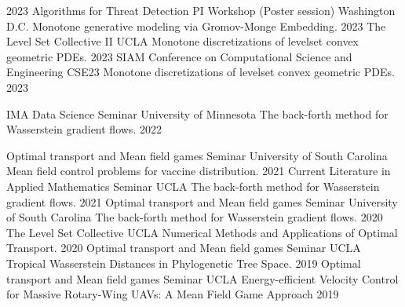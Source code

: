 \begin{cvtalks}
  \cvtalk
    {2023 Algorithms for Threat Detection PI Workshop (Poster session)} %
    {Washington D.C.}
    {Monotone generative modeling via Gromov-Monge Embedding.} %
    {2023} %
  \cvtalk
    {The Level Set Collective II} %
    {UCLA}
    {Monotone discretizations of levelset convex geometric PDEs.} %
    {2023} %
  \cvtalk
    {SIAM Conference on Computational Science and Engineering } %
    {CSE23}
    {Monotone discretizations of levelset convex geometric PDEs.} %
    {2023} %

  \cvtalk
    {IMA Data Science Seminar} %
    {University of Minnesota}
    {The back-forth method for Wasserstein gradient flows.} %
    {2022} %

  \cvtalk
    {Optimal transport and Mean field games Seminar} %
    {University of South Carolina}
    {Mean field control problems for vaccine distribution.} %
    {2021} %
  \cvtalk
    {Current Literature in Applied Mathematics Seminar} %
    {UCLA}
    {The back-forth method for Wasserstein gradient flows.} %
    {2021} %
  \cvtalk
    {Optimal transport and Mean field games Seminar} %
    {University of South Carolina}
    {The back-forth method for Wasserstein gradient flows.} %
    {2020} %
  \cvtalk
    {The Level Set Collective} %
    {UCLA}
    {Numerical Methods and Applications of Optimal Transport.} %
    {2020} %
  \cvtalk
    {Optimal transport and Mean field games Seminar} %
    {UCLA}
    {Tropical Wasserstein Distances in Phylogenetic Tree Space.} %
    {2019} %
    \cvtalk
    {Optimal transport and Mean field games Seminar} %
    {UCLA}
    {Energy-efficient Velocity Control for Massive Rotary-Wing UAVs: A Mean Field Game Approach} %
    {2019} %
\end{cvtalks}
\endgroup

